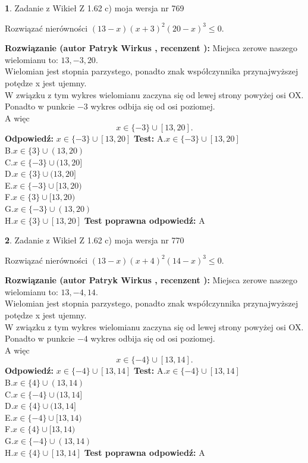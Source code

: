 \documentclass[12pt, a4paper]{article}
\theoremstyle{definition} %
\newtheorem{zad}{}
\newcommand{\zadStart}[1]{\begin{zad}#1\newline}
\newcommand{\zadStop}{\end{zad}}
\newcommand{\rozwStart}[2]{\noindent \textbf{Rozwiązanie (autor #1 , recenzent #2): }\newline}
\newcommand{\rozwStop}{\newline}
\newcommand{\odpStart}{\noindent \textbf{Odpowiedź:}\newline}
\newcommand{\odpStop}{\newline}
\newcommand{\testStart}{\noindent \textbf{Test:}\newline}
\newcommand{\testStop}{\newline}
\newcommand{\kluczStart}{\noindent \textbf{Test poprawna odpowiedź:}\newline}
\newcommand{\kluczStop}{\newline}
\begin{document}
\zadStart{Zadanie z Wikieł Z 1.62 c) moja wersja nr 769}

Rozwiązać nierówności $(13-x)(x+3)^{2}(20-x)^{3}\le0$.
\zadStop
\rozwStart{Patryk Wirkus}{}
Miejsca zerowe naszego wielomianu to: $13, -3, 20$.\\
Wielomian jest stopnia parzystego, ponadto znak współczynnika przy\linebreak najwyższej potędze x jest ujemny.\\ W związku z tym wykres wielomianu zaczyna się od lewej strony powyżej osi OX.\\
Ponadto w punkcie $-3$ wykres odbija się od osi poziomej.\\
A więc $$x \in \{-3\} \cup [13,20].$$
\rozwStop
\odpStart
$x \in \{-3\} \cup [13,20]$
\odpStop
\testStart
A.$x \in \{-3\} \cup [13,20]$\\
B.$x \in \{3\} \cup (13,20)$\\
C.$x \in \{-3\} \cup (13,20]$\\
D.$x \in \{3\} \cup (13,20]$\\
E.$x \in \{-3\} \cup [13,20)$\\
F.$x \in \{3\} \cup [13,20)$\\
G.$x \in \{-3\} \cup (13,20)$\\
H.$x \in \{3\} \cup [13,20]$
\testStop
\kluczStart
A
\kluczStop



\zadStart{Zadanie z Wikieł Z 1.62 c) moja wersja nr 770}

Rozwiązać nierówności $(13-x)(x+4)^{2}(14-x)^{3}\le0$.
\zadStop
\rozwStart{Patryk Wirkus}{}
Miejsca zerowe naszego wielomianu to: $13, -4, 14$.\\
Wielomian jest stopnia parzystego, ponadto znak współczynnika przy\linebreak najwyższej potędze x jest ujemny.\\ W związku z tym wykres wielomianu zaczyna się od lewej strony powyżej osi OX.\\
Ponadto w punkcie $-4$ wykres odbija się od osi poziomej.\\
A więc $$x \in \{-4\} \cup [13,14].$$
\rozwStop
\odpStart
$x \in \{-4\} \cup [13,14]$
\odpStop
\testStart
A.$x \in \{-4\} \cup [13,14]$\\
B.$x \in \{4\} \cup (13,14)$\\
C.$x \in \{-4\} \cup (13,14]$\\
D.$x \in \{4\} \cup (13,14]$\\
E.$x \in \{-4\} \cup [13,14)$\\
F.$x \in \{4\} \cup [13,14)$\\
G.$x \in \{-4\} \cup (13,14)$\\
H.$x \in \{4\} \cup [13,14]$
\testStop
\kluczStart
A
\kluczStop
\end{document}
